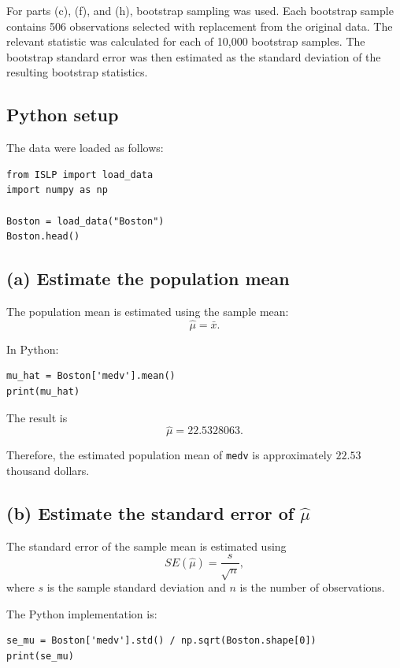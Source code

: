 \documentclass[12pt,a4paper]{article}
\begin{document}
For parts (c), (f), and (h), bootstrap sampling was used. Each bootstrap
sample contains 506 observations selected with replacement from the
original data. The relevant statistic was calculated for each of 10,000
bootstrap samples. The bootstrap standard error was then estimated as
the standard deviation of the resulting bootstrap statistics.

\subsection*{Python setup}

The data were loaded as follows:

\begin{lstlisting}
from ISLP import load_data
import numpy as np

Boston = load_data("Boston")
Boston.head()
\end{lstlisting}

\subsection*{(a) Estimate the population mean}

The population mean is estimated using the sample mean:
\[
\hat{\mu}=\bar{x}.
\]

In Python:

\begin{lstlisting}
mu_hat = Boston['medv'].mean()
print(mu_hat)
\end{lstlisting}

The result is
\[
\boxed{\hat{\mu}=22.5328063}.
\]

Therefore, the estimated population mean of \texttt{medv} is
approximately $22.53$ thousand dollars.

\subsection*{(b) Estimate the standard error of $\hat{\mu}$}

The standard error of the sample mean is estimated using
\[
SE(\hat{\mu})=\frac{s}{\sqrt{n}},
\]
where $s$ is the sample standard deviation and $n$ is the number of
observations.

The Python implementation is:

\begin{lstlisting}
se_mu = Boston['medv'].std() / np.sqrt(Boston.shape[0])
print(se_mu)
\end{lstlisting}
\end{document}

